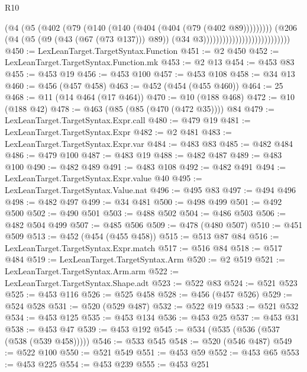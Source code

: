\begin{lexlean}{R10}
\begin{coremodule}
{{{{{{{{{{{{{{{{{{{{{{{{{{{{{{{{{{{{{{{{{{{{{{{{{{{                                                  (@4
                                                    (@5
                                                      (@402
                                                        (@79
                                                          (@140
                                                            (@140
                                                              (@404 (@404 (@79 (@402 @89)))))))))
                                                    (@206
                                                      (@4
                                                        (@5 (@9 (@43 (@67 (@73 @137))) @89))
                                                        (@34 @3)))))))))))))))))))))))))))
@450 := LexLeanTarget.TargetSyntax.Function
@451 := @2 @450
@452 := LexLeanTarget.TargetSyntax.Function.mk
@453 := @2 @13
@454 := @453 @83
@455 := @453 @19
@456 := @453 @100
@457 := @453 @108
@458 := @34 @13
@460 := @456 (@457 @458)
@463 := @452 (@454 (@455 @460))
@464 := 25
@468 := @11 (@14 @464 (@17 @464))
@470 := @10 (@188 @468)
@472 := @10 (@188 @42)
@478 := @463 (@85 (@85 (@470 (@472 @35)))) @84
@479 := LexLeanTarget.TargetSyntax.Expr.call
@480 := @479 @19
@481 := LexLeanTarget.TargetSyntax.Expr
@482 := @2 @481
@483 := LexLeanTarget.TargetSyntax.Expr.var
@484 := @483 @83
@485 := @482 @484
@486 := @479 @100
@487 := @483 @19
@488 := @482 @487
@489 := @483 @100
@490 := @482 @489
@491 := @483 @108
@492 := @482 @491
@494 := LexLeanTarget.TargetSyntax.Expr.value @40
@495 := LexLeanTarget.TargetSyntax.Value.nat
@496 := @495 @83
@497 := @494 @496
@498 := @482 @497
@499 := @34 @481
@500 := @498 @499
@501 := @492 @500
@502 := @490 @501
@503 := @488 @502
@504 := @486 @503
@506 := @482 @504 @499
@507 := @485 @506
@509 := @478 (@480 @507)
@510 := @451 @509
@513 := @452 (@454 (@455 @458))
@515 := @513 @87 @84
@516 := LexLeanTarget.TargetSyntax.Expr.match
@517 := @516 @84
@518 := @517 @484
@519 := LexLeanTarget.TargetSyntax.Arm
@520 := @2 @519
@521 := LexLeanTarget.TargetSyntax.Arm.arm
@522 := LexLeanTarget.TargetSyntax.Shape.adt
@523 := @522 @83
@524 := @521 @523
@525 := @453 @116
@526 := @525 @458
@528 := @456 (@457 @526)
@529 := @524 @528
@531 := @520 (@529 @487)
@532 := @522 @19
@533 := @521 @532
@534 := @453 @125
@535 := @453 @134
@536 := @453 @25
@537 := @453 @31
@538 := @453 @47
@539 := @453 @192
@545 := @534 (@535 (@536 (@537 (@538 (@539 @458)))))
@546 := @533 @545
@548 := @520 (@546 @487)
@549 := @522 @100
@550 := @521 @549
@551 := @453 @59
@552 := @453 @65
@553 := @453 @225
@554 := @453 @239
@555 := @453 @251
}}}}}}}}}}}}}}}}}}}}}}}}}}}}}}}}}}}}}}}}}}}}}}}}}}}
\end{coremodule}
\end{lexlean}
